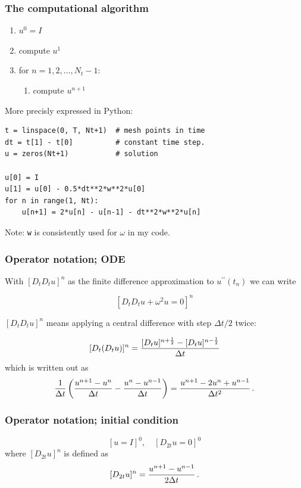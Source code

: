 \documentclass{beamer}
\begin{document}
\begin{frame}
\frametitle{The computational algorithm}

\begin{enumerate}
 \item $u^0=I$

 \item compute $u^1$

 \item for $n=1,2,\ldots,N_t-1$:
\begin{enumerate}

   \item compute $u^{n+1}$
\end{enumerate}

\noindent
\end{enumerate}

\noindent
More precisly expressed in Python:

\begin{verbatim}
t = linspace(0, T, Nt+1)  # mesh points in time
dt = t[1] - t[0]          # constant time step.
u = zeros(Nt+1)           # solution

u[0] = I
u[1] = u[0] - 0.5*dt**2*w**2*u[0]
for n in range(1, Nt):
    u[n+1] = 2*u[n] - u[n-1] - dt**2*w**2*u[n]
\end{verbatim}

Note: \texttt{w} is consistently used for $\omega$ in my code.
\end{frame}

\begin{frame}
\frametitle{Operator notation; ODE}

With $[D_tD_t u]^n$ as the finite difference approximation to
$u^{\prime\prime}(t_n)$ we can write

\[
[D_tD_t u  + \omega^2 u = 0]^n
\]

$[D_tD_t u]^n$ means applying a central difference with step $\Delta t/2$ twice:

\[ [D_t(D_t u)]^n = \frac{[D_t u]^{n+\half} - [D_t u]^{n-\half}}{\Delta t}\]
which is written out as
\[
\frac{1}{\Delta t}\left(\frac{u^{n+1}-u^n}{\Delta t} - \frac{u^{n}-u^{n-1}}{\Delta t}\right) = \frac{u^{n+1}-2u^n + u^{n-1}}{\Delta t^2}
\tp
\]
\end{frame}

\begin{frame}
\frametitle{Operator notation; initial condition}

\[
[u = I]^0,\quad [D_{2t} u = 0]^0
\]
where $[D_{2t} u]^n$ is defined as
\[
[D_{2t} u]^n = \frac{u^{n+1} - u^{n-1}}{2\Delta t}
\tp
\]
\end{frame}
\end{document}
